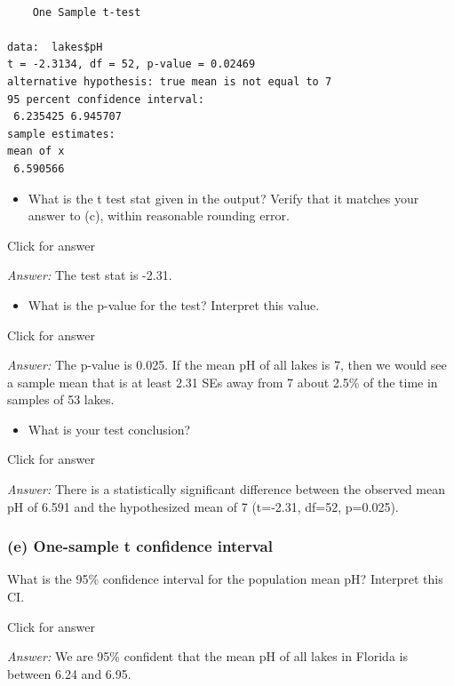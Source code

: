\documentclass[
]{book}
\providecommand{\tightlist}{%
  \setlength{\itemsep}{0pt}\setlength{\parskip}{0pt}}
\begin{document}
\begin{verbatim}

    One Sample t-test

data:  lakes$pH
t = -2.3134, df = 52, p-value = 0.02469
alternative hypothesis: true mean is not equal to 7
95 percent confidence interval:
 6.235425 6.945707
sample estimates:
mean of x 
 6.590566 
\end{verbatim}

\begin{itemize}
\tightlist
\item
  What is the t test stat given in the output? Verify that it matches your answer to (c), within reasonable rounding error.
\end{itemize}

Click for answer

\emph{Answer:} The test stat is -2.31.

\begin{itemize}
\tightlist
\item
  What is the p-value for the test? Interpret this value.
\end{itemize}

Click for answer

\emph{Answer:} The p-value is 0.025. If the mean pH of all lakes is 7, then we would see a sample mean that is at least 2.31 SEs away from 7 about 2.5\% of the time in samples of 53 lakes.

\begin{itemize}
\tightlist
\item
  What is your test conclusion?
\end{itemize}

Click for answer

\emph{Answer:} There is a statistically significant difference between the observed mean pH of 6.591 and the hypothesized mean of 7 (t=-2.31, df=52, p=0.025).

\hypertarget{e-one-sample-t-confidence-interval}{%
\subsubsection{(e) One-sample t confidence interval}\label{e-one-sample-t-confidence-interval}}

What is the 95\% confidence interval for the population mean pH? Interpret this CI.

Click for answer

\emph{Answer:} We are 95\% confident that the mean pH of all lakes in Florida is between 6.24 and 6.95.
\end{document}
